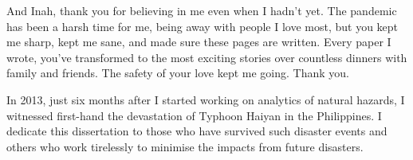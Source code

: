 {And Inah, thank you for believing in me even when I hadn’t yet. The pandemic has been a harsh time for me, being away with people I love most, but you kept me sharp, kept me sane, and made sure these pages are written. Every paper I wrote, you’ve transformed to the most exciting stories over countless dinners with family and friends. The safety of your love kept me going. Thank you.

In 2013, just six months after I started working on analytics of natural hazards, I witnessed first-hand the devastation of Typhoon Haiyan in the Philippines. I dedicate this dissertation to those who have survived such disaster events and others who work tirelessly to minimise the impacts from future disasters.




}
